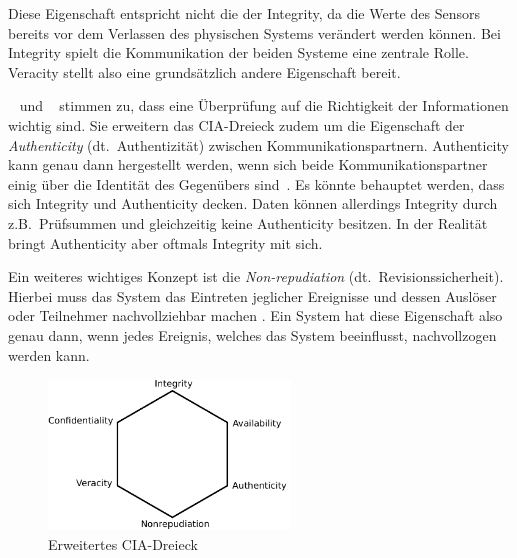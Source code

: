 \documentclass[final,bibliography=totocnumbered]{include/sikseminar}
\begin{document}
    Diese Eigenschaft entspricht nicht die der Integrity, da die Werte des Sensors bereits vor dem Verlassen des physischen Systems verändert werden können.
    Bei Integrity spielt die Kommunikation der beiden Systeme eine zentrale Rolle.
    Veracity stellt also eine grundsätzlich andere Eigenschaft bereit.

    \citeauthor{WYX+10}~\cite{WYX+10} und \citeauthor{SFJ17}~\cite{SFJ17} stimmen zu, dass eine Überprüfung auf die Richtigkeit der Informationen wichtig sind.
    Sie erweitern das CIA-Dreieck zudem um die Eigenschaft der \textit{Authenticity} (dt.\ Authentizität) zwischen Kommunikationspartnern.
    Authenticity kann genau dann hergestellt werden, wenn sich beide Kommunikationspartner einig über die Identität des Gegenübers sind~\cite{CH13}.
    Es könnte behauptet werden, dass sich Integrity und Authenticity decken.
    Daten können allerdings Integrity durch z.B.\ Prüfsummen und gleichzeitig keine Authenticity besitzen.
    In der Realität bringt Authenticity aber oftmals Integrity mit sich.

    Ein weiteres wichtiges Konzept ist die \textit{Non-repudiation} (dt.\ Revisionssicherheit).
    Hierbei muss das System das Eintreten jeglicher Ereignisse und dessen Auslöser oder Teilnehmer nachvollziehbar machen \cite{CH13}.
    Ein System hat diese Eigenschaft also genau dann, wenn jedes Ereignis, welches das System beeinflusst, nachvollzogen werden kann.

    \begin{figure}[ht]
        \centering
        \includegraphics[height=4cm]{triad}
        \caption{Erweitertes CIA-Dreieck}
        \label{fig:triad}
    \end{figure}
\end{document}
